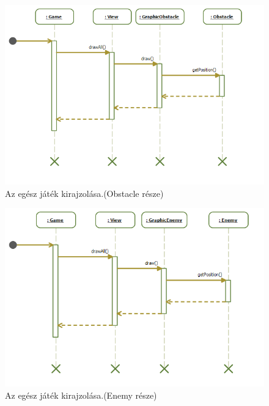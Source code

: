 \begin{figure}[H]
\begin{center}
\includegraphics[width=18cm]{images/grafikaSeq/step3.png}
\caption{Az egész játék kirajzolása.(Obstacle része)}
\label{fig:Graphic_drawAll_Obstacle}
\end{center}
\end{figure}

\begin{figure}[H]
\begin{center}
\includegraphics[width=18cm]{images/grafikaSeq/step4.png}
\caption{Az egész játék kirajzolása.(Enemy része)}
\label{fig:Graphic_drawAll_Enemy}
\end{center}
\end{figure}

